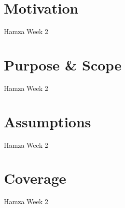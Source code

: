 \section{Motivation}
Hamza Week 2

\section{Purpose \& Scope}
Hamza Week 2

\section{Assumptions}
Hamza Week 2

\section{Coverage}
Hamza Week 2

